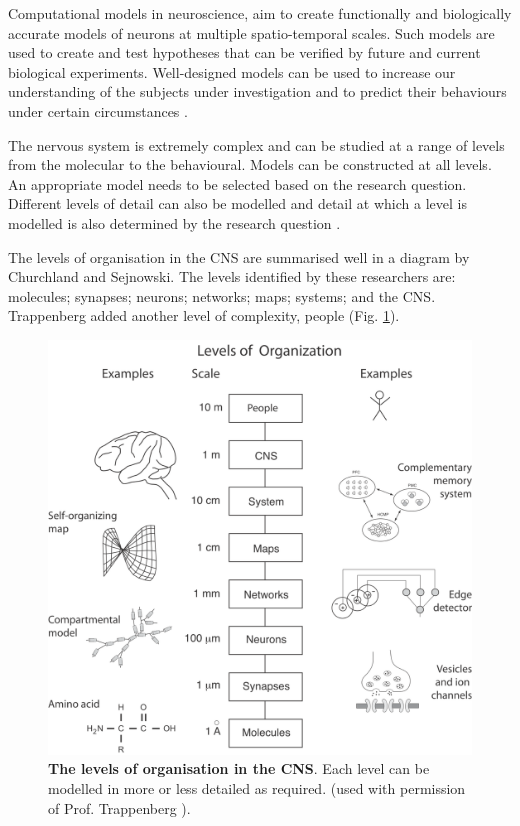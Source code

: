 Computational models in neuroscience, aim to create functionally and biologically accurate models of neurons at multiple spatio-temporal scales. Such models are used to create and test hypotheses that can be verified by future and current biological experiments. Well-designed models can be used to increase our understanding of the subjects under investigation and to predict their behaviours under certain circumstances \cite{Sterratt2011}.

The nervous system is extremely complex and can be studied at a range of levels from the molecular to the behavioural. Models can be constructed at all levels. An appropriate model needs to be selected based on the research question. Different levels of detail can also be modelled and detail at which a level is modelled is also determined by the research question \cite{Sterratt2011}.

The levels of organisation in the \ac{CNS} are summarised well in a diagram by Churchland and Sejnowski\cite{Churchland1992}. The levels identified by these researchers are: molecules; synapses; neurons; networks; maps; systems; and the \ac{CNS}. Trappenberg  added another level of complexity, people \cite{Trappenberg2009} (Fig. \ref{fig:levels}).

\begin{figure}[H]
	\centering
		\includegraphics[width=\columnwidth]{graphics/levels.png}
		\caption[The levels of organisation in the \ac{CNS}]{\textbf{The levels of organisation in the \ac{CNS}}. Each level can be modelled in more or less detailed as required. (used with permission of Prof. Trappenberg \cite{Trappenberg2009}).} 
		\label{fig:levels}
\end{figure}


